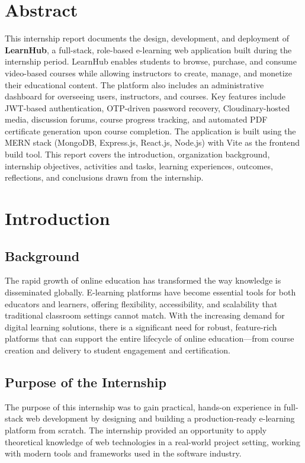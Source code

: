 \documentclass[12pt,a4paper]{report}
\begin{document}
\chapter*{Abstract}
This internship report documents the design, development, and deployment of \textbf{LearnHub}, a full-stack, role-based e-learning web application built during the internship period. LearnHub enables students to browse, purchase, and consume video-based courses while allowing instructors to create, manage, and monetize their educational content. The platform also includes an administrative dashboard for overseeing users, instructors, and courses. Key features include JWT-based authentication, OTP-driven password recovery, Cloudinary-hosted media, discussion forums, course progress tracking, and automated PDF certificate generation upon course completion. The application is built using the MERN stack (MongoDB, Express.js, React.js, Node.js) with Vite as the frontend build tool. This report covers the introduction, organization background, internship objectives, activities and tasks, learning experiences, outcomes, reflections, and conclusions drawn from the internship.

\tableofcontents
\listoffigures
\listoftables


\chapter{Introduction}

\section{Background}
The rapid growth of online education has transformed the way knowledge is disseminated globally. E-learning platforms have become essential tools for both educators and learners, offering flexibility, accessibility, and scalability that traditional classroom settings cannot match. With the increasing demand for digital learning solutions, there is a significant need for robust, feature-rich platforms that can support the entire lifecycle of online education---from course creation and delivery to student engagement and certification.

\section{Purpose of the Internship}
The purpose of this internship was to gain practical, hands-on experience in full-stack web development by designing and building a production-ready e-learning platform from scratch. The internship provided an opportunity to apply theoretical knowledge of web technologies in a real-world project setting, working with modern tools and frameworks used in the software industry.
\end{document}
